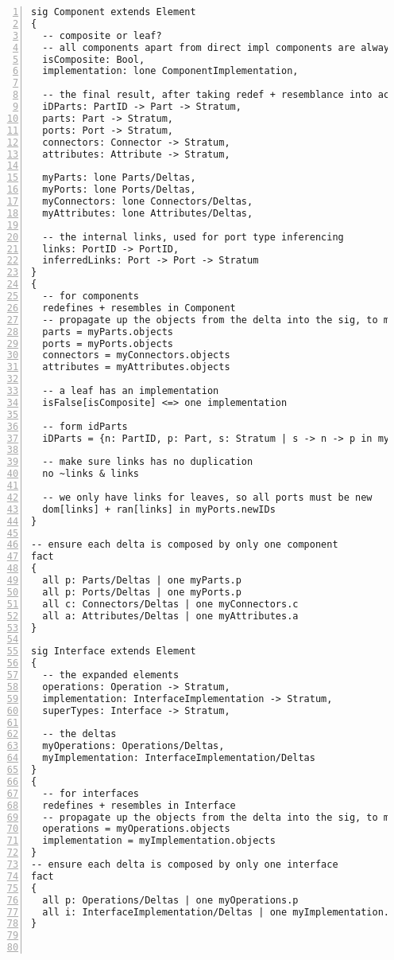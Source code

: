 \begin{lstlisting}[caption={structure.als}, numbers=left]
sig Component extends Element
{
  -- composite or leaf?
  -- all components apart from direct impl components are always composite
  isComposite: Bool,
  implementation: lone ComponentImplementation,

  -- the final result, after taking redef + resemblance into account
  iDParts: PartID -> Part -> Stratum,
  parts: Part -> Stratum,
  ports: Port -> Stratum,
  connectors: Connector -> Stratum,
  attributes: Attribute -> Stratum,
  
  myParts: lone Parts/Deltas,
  myPorts: lone Ports/Deltas,
  myConnectors: lone Connectors/Deltas,
  myAttributes: lone Attributes/Deltas,
  
  -- the internal links, used for port type inferencing
  links: PortID -> PortID,
  inferredLinks: Port -> Port -> Stratum
}
{
  -- for components
  redefines + resembles in Component
  -- propagate up the objects from the delta into the sig, to make it more convenient
  parts = myParts.objects
  ports = myPorts.objects
  connectors = myConnectors.objects
  attributes = myAttributes.objects

  -- a leaf has an implementation
  isFalse[isComposite] <=> one implementation
  
  -- form idParts
  iDParts = {n: PartID, p: Part, s: Stratum | s -> n -> p in myParts.objects_e}
  
  -- make sure links has no duplication
  no ~links & links
  
  -- we only have links for leaves, so all ports must be new
  dom[links] + ran[links] in myPorts.newIDs
}

-- ensure each delta is composed by only one component
fact
{
  all p: Parts/Deltas | one myParts.p
  all p: Ports/Deltas | one myPorts.p
  all c: Connectors/Deltas | one myConnectors.c
  all a: Attributes/Deltas | one myAttributes.a
}

sig Interface extends Element
{
  -- the expanded elements
  operations: Operation -> Stratum,  
  implementation: InterfaceImplementation -> Stratum,  
  superTypes: Interface -> Stratum,

  -- the deltas
  myOperations: Operations/Deltas,
  myImplementation: InterfaceImplementation/Deltas
}
{
  -- for interfaces
  redefines + resembles in Interface
  -- propagate up the objects from the delta into the sig, to make it more convenient
  operations = myOperations.objects  
  implementation = myImplementation.objects
}
-- ensure each delta is composed by only one interface
fact
{
  all p: Operations/Deltas | one myOperations.p
  all i: InterfaceImplementation/Deltas | one myImplementation.i
}



\end{lstlisting}
